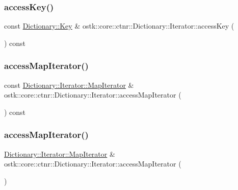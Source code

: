 \subsubsection{\texorpdfstring{access\+Key()}{accessKey()}}
{\footnotesize\ttfamily const \hyperlink{classostk_1_1core_1_1ctnr_1_1_dictionary_aa3b171525039535f342d271d27f90407}{Dictionary\+::\+Key} \& ostk\+::core\+::ctnr\+::\+Dictionary\+::\+Iterator\+::access\+Key (\begin{DoxyParamCaption}{ }\end{DoxyParamCaption}) const}

\mbox{\label{classostk_1_1core_1_1ctnr_1_1_dictionary_1_1_iterator_a578bb7a0d61c11f6a43ff9e67448707f}} 
\subsubsection{\texorpdfstring{access\+Map\+Iterator()}{accessMapIterator()}\hspace{0.1cm}{\footnotesize\ttfamily [1/2]}}
{\footnotesize\ttfamily const \hyperlink{classostk_1_1core_1_1ctnr_1_1_dictionary_1_1_iterator_a0d5a95dd4a931ded2d8d156da4499348}{Dictionary\+::\+Iterator\+::\+Map\+Iterator} \& ostk\+::core\+::ctnr\+::\+Dictionary\+::\+Iterator\+::access\+Map\+Iterator (\begin{DoxyParamCaption}{ }\end{DoxyParamCaption}) const}

\mbox{\label{classostk_1_1core_1_1ctnr_1_1_dictionary_1_1_iterator_abbd4e8107ae7f7c56f2b26a67552fd0d}} 
\subsubsection{\texorpdfstring{access\+Map\+Iterator()}{accessMapIterator()}\hspace{0.1cm}{\footnotesize\ttfamily [2/2]}}
{\footnotesize\ttfamily \hyperlink{classostk_1_1core_1_1ctnr_1_1_dictionary_1_1_iterator_a0d5a95dd4a931ded2d8d156da4499348}{Dictionary\+::\+Iterator\+::\+Map\+Iterator} \& ostk\+::core\+::ctnr\+::\+Dictionary\+::\+Iterator\+::access\+Map\+Iterator (\begin{DoxyParamCaption}{ }\end{DoxyParamCaption})}

